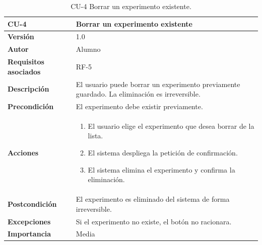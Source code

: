 \begin{table}[p]
	\centering
	\begin{tabularx}{\linewidth}{ p{} p{} }
		\toprule
		\textbf{CU-4}    & \textbf{Borrar un experimento existente} \\
		\toprule
		\textbf{Versión}              & 1.0    \\
		\textbf{Autor}                & Alumno \\
		\textbf{Requisitos asociados} & RF-5 \\
		\textbf{Descripción}          & El usuario puede borrar un experimento previamente guardado. La eliminación es irreversible. \\
		\textbf{Precondición}         & El experimento debe existir previamente. \\
		\textbf{Acciones}             &
		\begin{enumerate}
			\item El usuario elige el experimento que desea borrar de la lista.
			\item El sistema despliega la petición de confirmación.
			\item El sistema elimina el experimento y confirma la eliminación.
		\end{enumerate} \\
		\textbf{Postcondición}        & El experimento es eliminado del sistema de forma irreversible. \\
		\textbf{Excepciones}          & Si el experimento no existe, el botón no racionara. \\
		\textbf{Importancia}          & Media \\
		\bottomrule
	\end{tabularx}
	\caption{CU-4 Borrar un experimento existente.}
\end{table}

\FloatBarrier